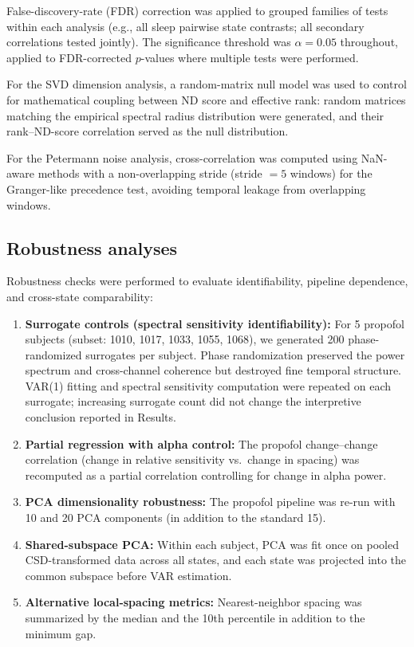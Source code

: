 \documentclass[preprint,12pt,nonatbib]{elsarticle}
\begin{document}
False-discovery-rate (FDR) correction \citep{Benjamini1995} was applied to grouped families of tests within each analysis (e.g., all sleep pairwise state contrasts; all secondary correlations tested jointly). The significance threshold was $\alpha=0.05$ throughout, applied to FDR-corrected $p$-values where multiple tests were performed.

For the SVD dimension analysis, a random-matrix null model was used to control for mathematical coupling between ND score and effective rank: random matrices matching the empirical spectral radius distribution were generated, and their rank--ND-score correlation served as the null distribution.

For the Petermann noise analysis, cross-correlation was computed using NaN-aware methods with a non-overlapping stride (stride $=5$ windows) for the Granger-like precedence test, avoiding temporal leakage from overlapping windows.

\subsection{Robustness analyses}

Robustness checks were performed to evaluate identifiability, pipeline dependence, and cross-state comparability:

\begin{enumerate}[leftmargin=1.5em]
    \item \textbf{Surrogate controls (spectral sensitivity identifiability):} For 5 propofol subjects (subset: 1010, 1017, 1033, 1055, 1068), we generated 200 phase-randomized surrogates per subject. Phase randomization preserved the power spectrum and cross-channel coherence but destroyed fine temporal structure. VAR(1) fitting and spectral sensitivity computation were repeated on each surrogate; increasing surrogate count did not change the interpretive conclusion reported in Results.
    \item \textbf{Partial regression with alpha control:} The propofol change--change correlation (change in relative sensitivity vs.\ change in spacing) was recomputed as a partial correlation controlling for change in alpha power.
    \item \textbf{PCA dimensionality robustness:} The propofol pipeline was re-run with 10 and 20 PCA components (in addition to the standard 15).
    \item \textbf{Shared-subspace PCA:} Within each subject, PCA was fit once on pooled CSD-transformed data across all states, and each state was projected into the common subspace before VAR estimation.
    \item \textbf{Alternative local-spacing metrics:} Nearest-neighbor spacing was summarized by the median and the 10th percentile in addition to the minimum gap.
\end{enumerate}
\end{document}
